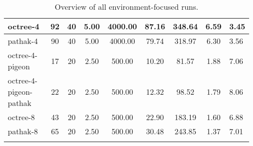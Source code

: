 \begin{sidewaystable}
\begin{longtable}{|l|c|c|c|c|c|c|c|}
octree-4 & {} \color[HTML]{000000} 92 & 40 & 5.00 & {} \color[HTML]{F1F1F1} 4000.00 & 87.16 & {} \color[HTML]{F1F1F1} 348.64 & 6.59 & 3.45 \\ \hline
pathak-4 & {} \color[HTML]{000000} 90 & 40 & 5.00 & {} \color[HTML]{F1F1F1} 4000.00 & 79.74 & {} \color[HTML]{F1F1F1} 318.97 & 6.30 & 3.56 \\ \hline
octree-4-pigeon & {} \color[HTML]{000000} 17 & 20 & 2.50 & {} \color[HTML]{000000} 500.00 & 10.20 & {} \color[HTML]{000000} 81.57 & 1.88 & 7.06 \\ \hline
octree-4-pigeon-pathak & {} \color[HTML]{000000} 22 & 20 & 2.50 & {} \color[HTML]{000000} 500.00 & 12.32 & {} \color[HTML]{000000} 98.52 & 1.79 & 8.06 \\ \hline
octree-8 & {} \color[HTML]{000000} 43 & 20 & 2.50 & {} \color[HTML]{000000} 500.00 & 22.90 & {} \color[HTML]{000000} 183.19 & 1.60 & 6.88 \\ \hline
pathak-8 & {} \color[HTML]{000000} 65 & 20 & 2.50 & {} \color[HTML]{000000} 500.00 & 30.48 & {} \color[HTML]{000000} 243.85 & 1.37 & 7.01 \\ \hline
        
        \caption{Overview of all environment-focused runs. \label{tab:RQ1-results-octreeFocusedRuns}}
    \end{longtable}

\end{sidewaystable}



    
        
